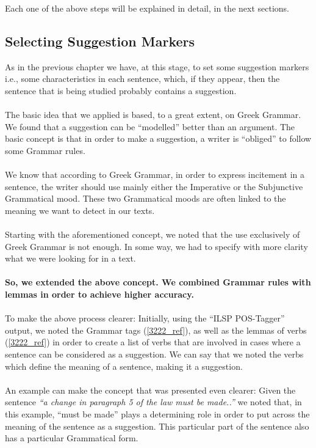 Each one of the above steps will be explained in detail, in the next sections.

\subsection{Selecting Suggestion Markers}\label{331_ref}
As in the previous chapter we have, at this stage, to set some suggestion markers i.e., some characteristics in each sentence, which, if they appear, then the sentence that is being studied probably contains a suggestion.\\
\\
The basic idea that we applied is based, to a great extent, on Greek Grammar. We found that a suggestion can be ``modelled'' better than an argument. The basic concept is that in order to make a suggestion, a writer is ``obliged'' to follow some Grammar rules.\\
\\
We know that according to Greek Grammar, in order to express incitement in a sentence, the writer should use mainly either the Imperative or the Subjunctive Grammatical mood. These two Grammatical moods are often linked to the meaning we want to detect in our texts.\\
\\
Starting with the aforementioned concept, we noted that the use exclusively of Greek Grammar is not enough. In some way, we had to specify with more clarity what we were looking for in a text.\\
\\
\textbf{So, we extended the above concept. We combined Grammar rules with lemmas in order to achieve higher accuracy.}\\
\\
To make the above process clearer: Initially, using the ``ILSP POS-Tagger'' output, we noted the Grammar tags (\ref{3222_ref}), as well as the lemmas of verbs (\ref{3222_ref}) in order to create a list of verbs that are involved in cases where a sentence can be considered  as a suggestion. We can say that we noted the verbs which define the meaning of a sentence, making it a suggestion.\\
\\
An example can make the concept that was presented even clearer: Given the sentence \textit{``a change in paragraph 5 of the law  must be made..''} we noted that, in this example, ``must be made'' plays a determining role in order to put across the meaning of the sentence as a suggestion. This particular part of the sentence also has a particular Grammatical form.\\
